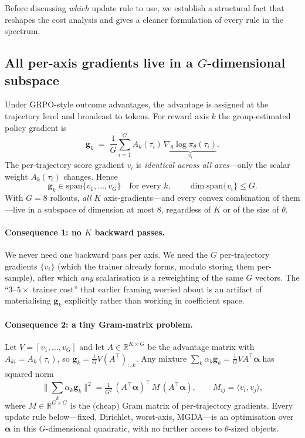 \documentclass[11pt,a4paper]{article}
\newcommand{\R}{\mathbb{R}}
\begin{document}
Before discussing \emph{which} update rule to use, we establish a structural
fact that reshapes the cost analysis and gives a cleaner formulation of every
rule in the spectrum.

\subsection{All per-axis gradients live in a $G$-dimensional subspace}

Under GRPO-style outcome advantages, the advantage is assigned at the
trajectory level and broadcast to tokens.  For reward axis $k$ the
group-estimated policy gradient is
\begin{equation}
  \bm{g}_k
  \;=\; \frac{1}{G}\sum_{i=1}^{G} A_k(\tau_i)\,
        \underbrace{\nabla_\theta \log \pi_\theta(\tau_i)}_{\textstyle v_i}.
  \label{eq:gk}
\end{equation}
The per-trajectory score gradient $v_i$ is \emph{identical across all
axes}---only the scalar weight $A_k(\tau_i)$ changes.  Hence
\begin{equation}
  \bm{g}_k \in \mathrm{span}\{v_1,\dots,v_G\}
  \quad\text{for every } k,
  \qquad
  \dim \mathrm{span}\{v_i\} \le G .
  \label{eq:span}
\end{equation}
With $G=8$ rollouts, \emph{all} $K$ axis-gradients---and every convex
combination of them---live in a subspace of dimension at most $8$,
regardless of $K$ or of the size of $\theta$.

\paragraph{Consequence 1: no $K$ backward passes.}
We never need one backward pass per axis.  We need the $G$ per-trajectory
gradients $\{v_i\}$ (which the trainer already forms, modulo storing them
per-sample), after which \emph{any} scalarisation is a reweighting of the
same $G$ vectors.  The ``$3$--$5\times$ trainer cost'' that earlier framing
worried about is an artifact of materialising $\bm g_k$ explicitly rather
than working in coefficient space.

\paragraph{Consequence 2: a tiny Gram-matrix problem.}
Let $V = [v_1,\dots,v_G]$ and let $A \in \R^{K\times G}$ be the advantage
matrix with $A_{ki}=A_k(\tau_i)$, so $\bm g_k = \tfrac1G V (A^\top)_{:,k}$.
Any mixture $\sum_k \alpha_k \bm g_k = \tfrac1G V A^\top \bm\alpha$ has squared
norm
\begin{equation}
  \Big\|\textstyle\sum_k \alpha_k \bm g_k\Big\|^2
  = \tfrac1{G^2}\,(A^\top\bm\alpha)^\top\, M\, (A^\top\bm\alpha),
  \qquad
  M_{ij} = \langle v_i, v_j\rangle,
  \label{eq:gram}
\end{equation}
where $M\in\R^{G\times G}$ is the (cheap) Gram matrix of per-trajectory
gradients.  Every update rule below---fixed, Dirichlet, worst-axis, MGDA---is
an optimisation over $\bm\alpha$ in this $G$-dimensional quadratic, with no
further access to $\theta$-sized objects.
\end{document}
